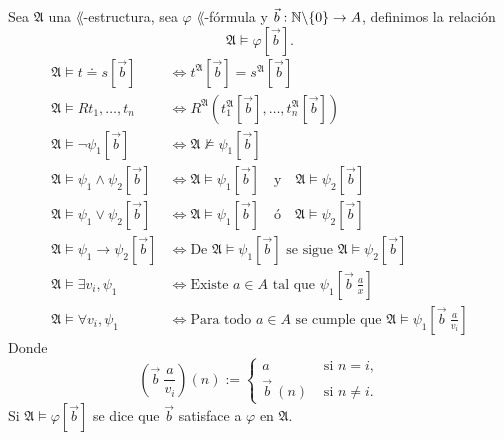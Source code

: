 \begin{definition}
  Sea $\mathfrak{A}$ una $\lang$-estructura, sea $\varphi$ $\lang$-f\'ormula y $\vec{b} : \mathbb{N} \backslash \{ 0 \} \to A$, definimos la relaci\'on
  \[ \mathfrak{A} \models \varphi [\vec{b}]. \]
  \begin{align*}
    \mathfrak{A} \models t \doteq s [\vec{b}] &\iff t^{\mathfrak{A}} [\vec{b}] = s^{\mathfrak{A}} [\vec{b}]\\
    \mathfrak{A} \models R t_1, \dots, t_n &\iff R^{\mathfrak{A}} \left( t_1^{\mathfrak{A}} [\vec{b}], \dots, t_n^{\mathfrak{A}} [\vec{b}] \right)\\
    \mathfrak{A} \models \neg \psi_1 [\vec{b}] &\iff \mathfrak{A} \not\models \psi_1 [\vec{b}]\\
    \mathfrak{A} \models \psi_1 \land \psi_2 [\vec{b}] &\iff \mathfrak{A} \models \psi_1 [\vec{b}] \quad \text{y} \quad \mathfrak{A} \models \psi_2 [\vec{b}]\\
    \mathfrak{A} \models \psi_1 \lor \psi_2 [\vec{b}] &\iff \mathfrak{A} \models \psi_1 [\vec{b}] \quad \text{\'o} \quad \mathfrak{A} \models \psi_2 [\vec{b}]\\
    \mathfrak{A} \models \psi_1 \to \psi_2 [\vec{b}] &\iff \text{De } \mathfrak{A} \models \psi_1 [\vec{b}] \text{ se sigue } \mathfrak{A} \models \psi_2 [\vec{b}]\\
    \mathfrak{A} \models \exists v_i, \psi_1 &\iff \text{Existe } a \in A \text{ tal que } \psi_1 \left[   \vec{b} \ \frac{a}{x}\right]\\
    \mathfrak{A} \models \forall v_i, \psi_1 &\iff \text{Para todo } a \in A \text{ se cumple que } \mathfrak{A} \models \psi_1 \left[ \vec{b} \ \frac{a}{v_i} \right]
  \end{align*}
  Donde 
  \[
    \left( \vec{b} \ \frac{a}{v_i} \right) (n) :=
    \begin{cases}
      a &\text{ si } n = i,\\
      \vec{b} \ (n) &\text{ si } n \neq i.
    \end{cases}
  \]
  Si $\mathfrak{A} \models \varphi [\vec{b}]$ se dice que $\vec{b}$ satisface a $\varphi$ en $\mathfrak{A}$.
\end{definition}
\newpage

